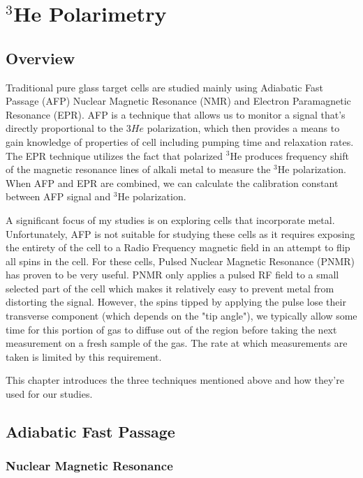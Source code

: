 \chapter{$^{3}$He Polarimetry}
\label{chap:chap3}

\section{Overview}

Traditional pure glass target cells are studied mainly using Adiabatic Fast Passage (AFP) Nuclear Magnetic Resonance (NMR) and Electron Paramagnetic Resonance (EPR). AFP is a technique that allows us to monitor a signal that's directly proportional to the ${3}He$ polarization, which then provides a means to gain knowledge of properties of cell including pumping time and relaxation rates. The EPR technique utilizes the fact that polarized $^{3}$He produces frequency shift of the magnetic resonance lines of alkali metal to measure the $^{3}$He polarization. When AFP and EPR are combined, we can calculate the calibration constant between AFP signal and $^{3}$He polarization. 

A significant focus of my studies is on exploring cells that incorporate metal. Unfortunately, AFP is not suitable for studying these cells as it requires exposing the entirety of the cell to a Radio Frequency magnetic field in an attempt to flip all spins in the cell. For these cells, Pulsed Nuclear Magnetic Resonance (PNMR) has proven to be very useful. PNMR only applies a pulsed RF field to a small selected part of the cell which makes it relatively easy to prevent metal from distorting the signal. However, the spins tipped by applying the pulse lose their transverse component (which depends on the "tip angle"), we typically allow some time for this portion of gas to diffuse out of the region before taking the next measurement on a fresh sample of the gas. The rate at which measurements are taken is limited by this requirement.

This chapter introduces the three techniques mentioned above and how they're used for our studies.

\section{Adiabatic Fast Passage}

\subsection{Nuclear Magnetic Resonance}

